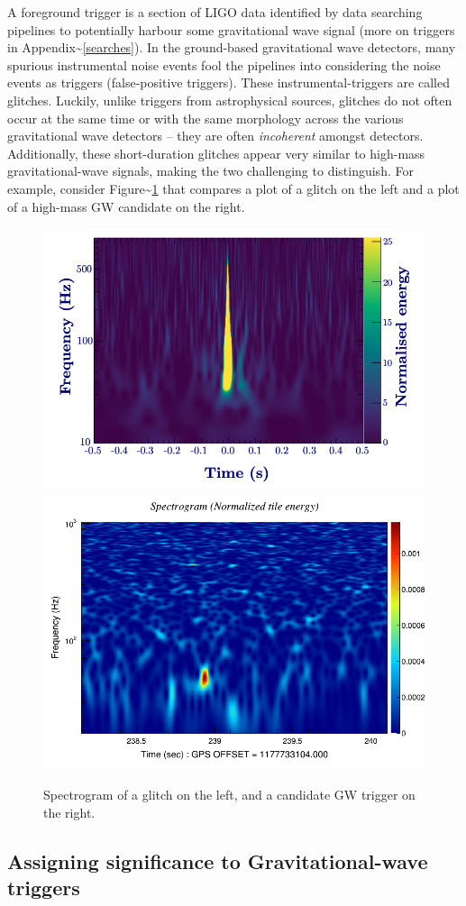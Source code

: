 \documentclass[%
 reprint,
 amsmath,amssymb,
 aps,
]{revtex4-2}
\begin{document}
A foreground trigger is a section of LIGO data identified by data searching pipelines to potentially harbour some
gravitational wave signal (more on triggers in Appendix\textasciitilde\ref{searches}). In the ground-based gravitational wave
detectors, many spurious instrumental noise events fool the pipelines into considering the noise events as triggers
(false-positive triggers). These instrumental-triggers are called glitches. Luckily, unlike triggers from astrophysical
sources, glitches do not often occur at the same time or with the same morphology across the various gravitational wave
detectors -- they are often \emph{incoherent} amongst detectors. Additionally, these short-duration glitches appear very
similar to high-mass gravitational-wave signals, making the two challenging to distinguish. For example, consider
Figure\textasciitilde\ref{fig:compareGlitchAndSignal} that compares a plot of a glitch on the left and a plot of a high-mass GW
candidate on the right.



\begin{figure}

{\centering \includegraphics[width=0.45\linewidth]{images/glitch} \includegraphics[width=0.45\linewidth]{images/L1_spectrogram_logy_0} 

}

\caption[Comparing glitches to high-mass candidates.]{Spectrogram of a glitch on the left, and a candidate GW trigger on the right.}\label{fig:compareGlitchAndSignal}
\end{figure}

\hypertarget{assigning-significance-to-gravitational-wave-triggers}{%
\subsection{Assigning significance to Gravitational-wave triggers}\label{assigning-significance-to-gravitational-wave-triggers}}
\end{document}
